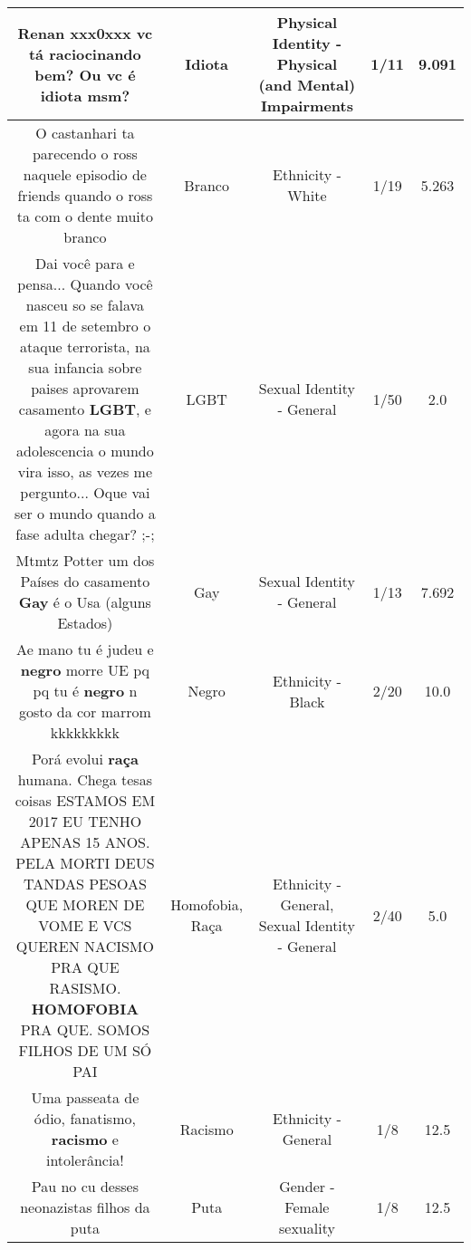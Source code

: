 \documentclass[11pt]{article}
\newlength\mylength
\begin{document}
\begin{center}
\begin{longtable}{|C{.65\mylength}|C{.30\mylength}|C{.12\mylength}|C{.12\mylength}|C{.12\mylength}|}
  \small Renan xxx0xxx vc tá raciocinando bem? Ou vc é \textbf{idiota} msm?\normalsize   & Idiota & Physical Identity - Physical (and Mental) Impairments & 1/11 & 9.091 \\  \hline
  \small O castanhari ta parecendo o ross naquele episodio de friends quando o ross ta com o dente muito branco\normalsize   & Branco & Ethnicity - White & 1/19 & 5.263 \\  \hline
  \small Dai você para e pensa... Quando você nasceu so se falava em 11 de setembro o ataque terrorista, na sua infancia sobre paises aprovarem casamento \textbf{LGBT}, e agora na sua adolescencia o mundo vira isso, as vezes me pergunto... Oque vai ser o mundo quando a fase adulta chegar? ;-;\normalsize   & LGBT & Sexual Identity - General & 1/50 & 2.0 \\  \hline
  \small Mtmtz Potter um dos Países do casamento \textbf{Gay} é o Usa (alguns Estados)\normalsize   & Gay & Sexual Identity - General & 1/13 & 7.692 \\  \hline
  \small Ae mano tu é judeu e \textbf{negro} morre UE pq pq tu é \textbf{negro} n gosto da cor marrom kkkkkkkkk\normalsize   & Negro & Ethnicity - Black & 2/20 & 10.0 \\  \hline
  \small Porá evolui \textbf{raça} humana. Chega tesas coisas ESTAMOS EM 2017 EU TENHO APENAS 15 ANOS. PELA MORTI DEUS TANDAS PESOAS QUE MOREN DE VOME E VCS QUEREN NACISMO PRA QUE RASISMO. \textbf{HOMOFOBIA} PRA QUE. SOMOS FILHOS DE UM SÓ PAI\normalsize   & Homofobia, Raça & Ethnicity - General, Sexual Identity - General & 2/40 & 5.0 \\  \hline
  \small Uma passeata de ódio, fanatismo, \textbf{racismo} e intolerância!\normalsize   & Racismo & Ethnicity - General & 1/8 & 12.5 \\  \hline
  \small Pau no cu desses neonazistas filhos da puta\normalsize   & Puta & Gender - Female sexuality & 1/8 & 12.5 \\  \hline

\end{longtable}
\end{center}
\end{document}
